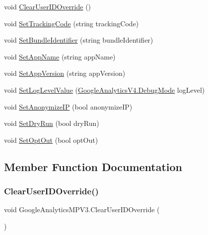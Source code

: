 \begin{DoxyCompactItemize}
\item 
void \hyperlink{class_google_analytics_m_p_v3_a88107a6b75bcb5a12a7d0eee2650b5df}{Clear\+User\+I\+D\+Override} ()
\item 
void \hyperlink{class_google_analytics_m_p_v3_a248c93d7193a440ae3219ce3a2ae5549}{Set\+Tracking\+Code} (string tracking\+Code)
\item 
void \hyperlink{class_google_analytics_m_p_v3_ac46ea6538810a84781bd591dd147a0b4}{Set\+Bundle\+Identifier} (string bundle\+Identifier)
\item 
void \hyperlink{class_google_analytics_m_p_v3_a6873e54c9dfa09a2fff610941cabeabc}{Set\+App\+Name} (string app\+Name)
\item 
void \hyperlink{class_google_analytics_m_p_v3_ac5df93b3893445ae6d63dac29dfccad9}{Set\+App\+Version} (string app\+Version)
\item 
void \hyperlink{class_google_analytics_m_p_v3_a77c5a5763efe63a0af3d863e60d2dad9}{Set\+Log\+Level\+Value} (\hyperlink{class_google_analytics_v4_a53191bc619081f5781932db905fbf30d}{Google\+Analytics\+V4.\+Debug\+Mode} log\+Level)
\item 
void \hyperlink{class_google_analytics_m_p_v3_a5aba346ef1d4c9359d2db5f238f8fb80}{Set\+Anonymize\+IP} (bool anonymize\+IP)
\item 
void \hyperlink{class_google_analytics_m_p_v3_a4183f51a04fbfca82bf26123ac5ac8ed}{Set\+Dry\+Run} (bool dry\+Run)
\item 
void \hyperlink{class_google_analytics_m_p_v3_ad655b7e2d63ae214e09b789aa4cd847b}{Set\+Opt\+Out} (bool opt\+Out)
\end{DoxyCompactItemize}


\subsection{Member Function Documentation}
\mbox{\label{class_google_analytics_m_p_v3_a88107a6b75bcb5a12a7d0eee2650b5df}} 
\subsubsection{\texorpdfstring{Clear\+User\+I\+D\+Override()}{ClearUserIDOverride()}}
{\footnotesize\ttfamily void Google\+Analytics\+M\+P\+V3.\+Clear\+User\+I\+D\+Override (\begin{DoxyParamCaption}{ }\end{DoxyParamCaption})}

